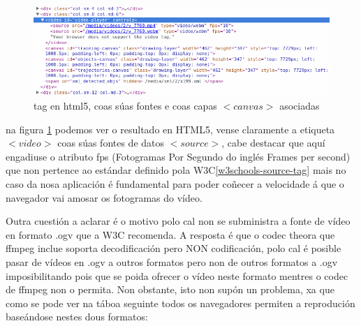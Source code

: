     \begin{figure}[htp]
    \begin{center}
        \includegraphics[scale=0.55]{figures/VideoTagHtml5.png}
        \caption{tag en html5, coas súas fontes e coas capas $<canvas>$ asociadas}
    \label{fig:VideoTagHtml5}
    \end{center}
    \end{figure}
    
    na figura \ref{fig:VideoTagHtml5} podemos ver o resultado en HTML5, vense claramente a etiqueta
    $<video>$ coas súas fontes de datos $<source>$, cabe destacar que aquí engadiuse o atributo fps
    (Fotogramas Por Segundo do inglés Frames per second) que non pertence ao estándar definido pola 
    W3C\ref{w3schools-source-tag} mais no caso da nosa aplicación é fundamental para poder coñecer 
    a velocidade á que o navegador vai amosar os fotogramas do vídeo.
    
    Outra cuestión a aclarar é o motivo polo cal non se subministra a fonte de vídeo en formato
    .ogv que a W3C recomenda. A resposta é que o codec theora que ffmpeg inclue soporta 
    decodificación pero NON codificación, polo cal é posible pasar de vídeos en .ogv a outros 
    formatos pero non de outros formatos a .ogv imposibilitando pois que se poida ofrecer o 
    vídeo neste formato mentres o codec de ffmpeg non o permita. Non obstante, isto non supón un 
    problema, xa que como se pode ver na táboa seguinte todos os navegadores permiten a reprodución
    baseándose nestes dous formatos:
    
